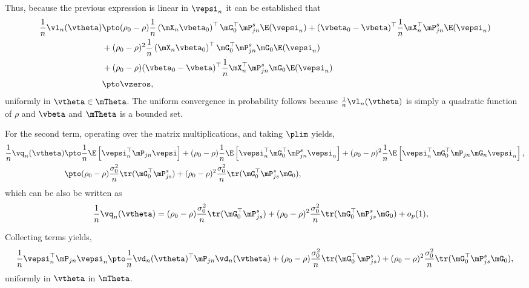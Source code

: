 \documentclass[english,12pt]{book}\usepackage[]{graphicx}\usepackage[]{xcolor}
\begin{document}
Thus, because the previous expression is linear in $\vepsi_n$ it can be established that
\begin{equation*}
  \begin{aligned}
    \frac{1}{n}\vl_n(\vtheta) & \pto  (\rho_0 - \rho)\frac{1}{n}\left(\mX_n\vbeta_0\right)^\top \mG_0^\top \mP_{jn}^s\E(\vepsi_n) + (\vbeta_0 - \vbeta)^\top \frac{1}{n}\mX_n^\top\mP_{jn}^s\E(\vepsi_n) \\
    & +  (\rho_0 - \rho)^2\frac{1}{n}\left(\mX_n\vbeta_0\right)^\top \mG_0^\top \mP_{jn}^s\mG_0\E(\vepsi_n) \\
    & + (\rho_0 - \rho)(\vbeta_0 - \vbeta)^\top\frac{1}{n}\mX_n^\top\mP_{jn}^s\mG_0\E(\vepsi_{n}) \\
    & \pto \vzeros, 
  \end{aligned}
\end{equation*}
uniformly in $\vtheta \in \mTheta$. The uniform convergence in probability follows because $\frac{1}{n}\vl_n(\vtheta)$ is simply a quadratic function of $\rho$ and $\vbeta$ and $\mTheta$ is a bounded set. 

For the second term, operating over the matrix multiplications, and taking $\plim$ yields, 
\begin{equation*}
  \begin{aligned}
    \frac{1}{n}\vq_n(\vtheta) & \pto  \frac{1}{n}\E\left[\vepsi_n^\top\mP_{jn}\vepsi\right] + (\rho_0 - \rho)\frac{1}{n}\E\left[\vepsi_n^\top\mG_0^\top\mP_{jn}^s\vepsi_n\right]  + (\rho_0 - \rho)^2\frac{1}{n}\E\left[\vepsi_n^\top\mG_0^\top\mP_{jn}\mG_n\vepsi_n\right],  \\
    & \pto (\rho_0 - \rho) \frac{\sigma_0^2}{n}\tr(\mG_0^\top\mP_{js}^s) + (\rho_0-\rho)^2\frac{\sigma_0^2}{n}\tr(\mG_0^\top\mP_{js}^s\mG_0),  
  \end{aligned}
\end{equation*} 
%
which can be also be written as
\begin{equation*}
  \begin{aligned}
    \frac{1}{n}\vq_n(\vtheta) & = (\rho_0 - \rho) \frac{\sigma_0^2}{n}\tr(\mG_0^\top\mP_{js}^s) + (\rho_0-\rho)^2\frac{\sigma_0^2}{n}\tr(\mG_0^\top\mP_{js}^s\mG_0) + o_p(1), 
  \end{aligned}
\end{equation*} 

Collecting terms yields, 
\begin{equation*}
\begin{aligned}
\frac{1}{n}\vepsi_n^\top\mP_{jn}\vepsi_n \pto \frac{1}{n}\vd_n(\vtheta)^\top\mP_{jn}\vd_n(\vtheta) + (\rho_0 - \rho) \frac{\sigma_0^2}{n}\tr(\mG_0^\top\mP_{js}^s) + (\rho_0-\rho)^2\frac{\sigma_0^2}{n}\tr(\mG_0^\top\mP_{js}^s\mG_0),
\end{aligned}
\end{equation*}
%
uniformly in $\vtheta$ in $\mTheta$. 
\end{document}
